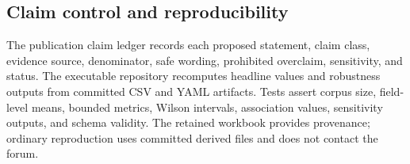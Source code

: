 \subsection{Claim control and reproducibility}

The publication claim ledger records each proposed statement, claim class, evidence source, denominator, safe wording, prohibited overclaim, sensitivity, and status. The executable repository recomputes headline values and robustness outputs from committed CSV and YAML artifacts. Tests assert corpus size, field-level means, bounded metrics, Wilson intervals, association values, sensitivity outputs, and schema validity. The retained workbook provides provenance; ordinary reproduction uses committed derived files and does not contact the forum.
